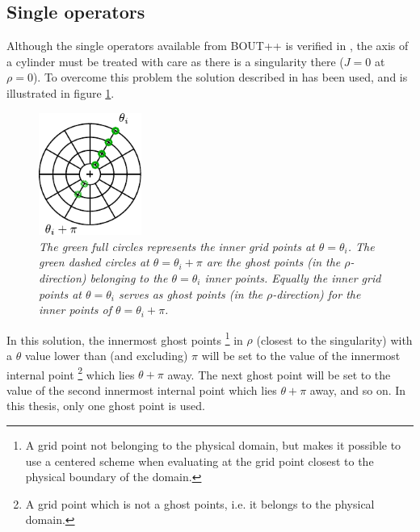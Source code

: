 \subsection{Single operators}
%
Although the single operators available from BOUT++ is verified in \cite{Dudson2016}, the axis of a cylinder must be treated with care as there is a singularity there ($J=0$ at $\rho=0$).
To overcome this problem the solution described in \cite{Naulin2008} has been used, and is illustrated in figure \ref{fig:innerRho}.
%
\begin{figure}[htb]
    \centering
    \includegraphics[width=0.3\textwidth]{fig/innerGhost}
    \caption{\textit{
        The green full circles represents the inner grid points at
        $\theta=\theta_i$. The green dashed circles at $\theta=\theta_i + \pi$
        are the ghost points (in the $\rho$-direction) belonging to the
        $\theta=\theta_i$ inner points. Equally the inner grid points at
        $\theta=\theta_i$ serves as ghost points (in the $\rho$-direction) for
        the inner points of $\theta=\theta_i + \pi$.
    }}
    \label{fig:innerRho}
\end{figure}
%
In this solution, the innermost ghost points%
\footnote{A grid point not belonging to the physical domain, but makes it possible to use a centered scheme when evaluating at the grid point closest to the physical boundary of the domain.}
in $\rho$ (closest to the singularity) with a $\theta$ value lower than (and excluding) $\pi$ will be set to the value of the innermost internal point%
\footnote{A grid point which is not a ghost points, i.e. it belongs to the physical domain.}%
%
which lies $\theta + \pi$ away.
The next ghost point will be set to the value of the second innermost internal point which lies $\theta + \pi$ away, and so on.
In this thesis, only one ghost point is used.

